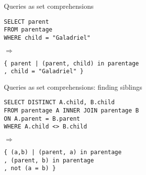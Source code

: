 \documentclass[xcolor=table,usenames,dvipsnames,svgnames]{beamer}
\newcommand{\df}{\color{RoyalBlue}}
\renewcommand{\df}{}
\begin{document}

\begin{frame}{Queries as set comprehensions}\Large\centering
  \begin{minipage}{0.7\textwidth}
    \texttt{SELECT {\color{orange}parent}\\
      FROM {\color{Green}parentage}\\
      WHERE {\color{DarkOrchid}child = "Galadriel"}}
  \end{minipage}

  \pause
  \vspace{1.5em}
  {\LARGE $\Longrightarrow$}
  \vspace{1em}

  \begin{minipage}{1.0\textwidth}
    \df\tt \{ {\color{orange}parent}
    | {\color{Green}(parent, child) in parentage}\\
    , {\color{DarkOrchid}child = "Galadriel"} \}
  \end{minipage}
\end{frame}

\begin{frame}{Queries as set comprehensions: finding siblings}\large\centering
  \begin{minipage}{0.9\textwidth}
    \tt SELECT DISTINCT {\color{orange}A.child, B.child}\\
    FROM {\color{Green}parentage A} INNER JOIN {\color{RoyalBlue}parentage B}\\
    ON {A.parent = B.parent}
    \\WHERE {\color{DarkOrchid}A.child <> B.child}
  \end{minipage}

  \vspace{1.5em}
  {\LARGE $\Longrightarrow$}
  \vspace{1em}

  \begin{minipage}{0.8\textwidth}
    \df\tt\{ {\color{orange}(a,b)}
    | {\color{Green}({parent}, a) in parentage}\\
    , {\color{RoyalBlue}({parent}, b) in parentage}\\
    , {\color{DarkOrchid}not (a = b)} \}
  \end{minipage}
\end{frame}


\end{document}
